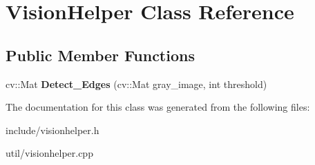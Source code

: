 \hypertarget{classVisionHelper}{}\section{Vision\+Helper Class Reference}
\label{classVisionHelper}
\subsection*{Public Member Functions}
\begin{DoxyCompactItemize}
\item 
\mbox{\label{classVisionHelper_abac0bb077c344e45e2066ab8f1bd9ec8}} 
cv\+::\+Mat {\bfseries Detect\+\_\+\+Edges} (cv\+::\+Mat gray\+\_\+image, int threshold)
\end{DoxyCompactItemize}


The documentation for this class was generated from the following files\+:\begin{DoxyCompactItemize}
\item 
include/visionhelper.\+h\item 
util/visionhelper.\+cpp\end{DoxyCompactItemize}
